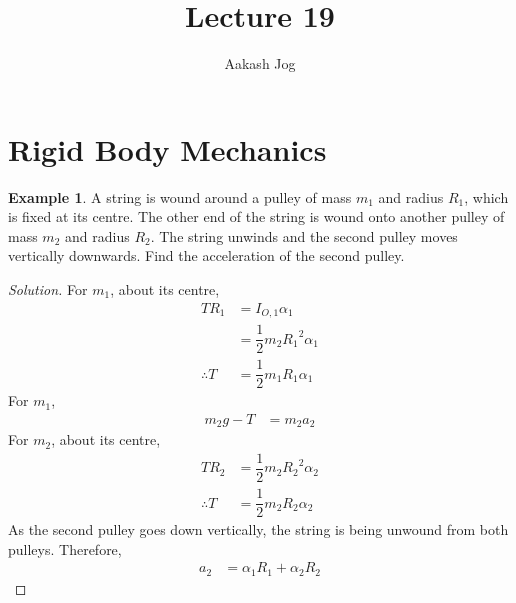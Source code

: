 \documentclass[fleqn, a4paper, 12pt]{article}
\title{Lecture 19}
\author{Aakash Jog}
\date{\formatdate{1}{1}{2015}}
\theoremstyle{definition}
\newtheorem{example}{Example}
\theoremstyle{theorem}
\newenvironment{solution}
{\begin{proof}[Solution]\let\qed\relax}
	{\end{proof}}
\begin{document}
\maketitle

\tableofcontents

\newpage
\section{Rigid Body Mechanics}

\begin{example}
	A string is wound around a pulley of mass $m_1$ and radius $R_1$, which is fixed at its centre. The other end of the string is wound onto another pulley of mass $m_2$ and radius $R_2$. The string unwinds and the second pulley moves vertically downwards. Find the acceleration of the second pulley.\\
\end{example}

\begin{solution}
	For $m_1$, about its centre,
	\begin{align*}
		T R_1 &= I_{O,1} \alpha_1\\
		&= \dfrac{1}{2} m_2 {R_1}^2 \alpha_1\\
		\therefore T &= \dfrac{1}{2} m_1 R_1 \alpha_1
	\end{align*}
	For $m_1$,
	\begin{align*}
		m_2 g - T &= m_2 a_2
	\end{align*}
	For $m_2$, about its centre,
	\begin{align*}
		T R_2 &= \dfrac{1}{2} m_2 {R_2}^2 \alpha_2\\
		\therefore T &= \dfrac{1}{2} m_2 R_2 \alpha_2
	\end{align*}
	As the second pulley goes down vertically, the string is being unwound from both pulleys. Therefore,
	\begin{align*}
		a_2 &= \alpha_1 R_1 + \alpha_2 R_2
	\end{align*}
\end{solution}
\end{document}
